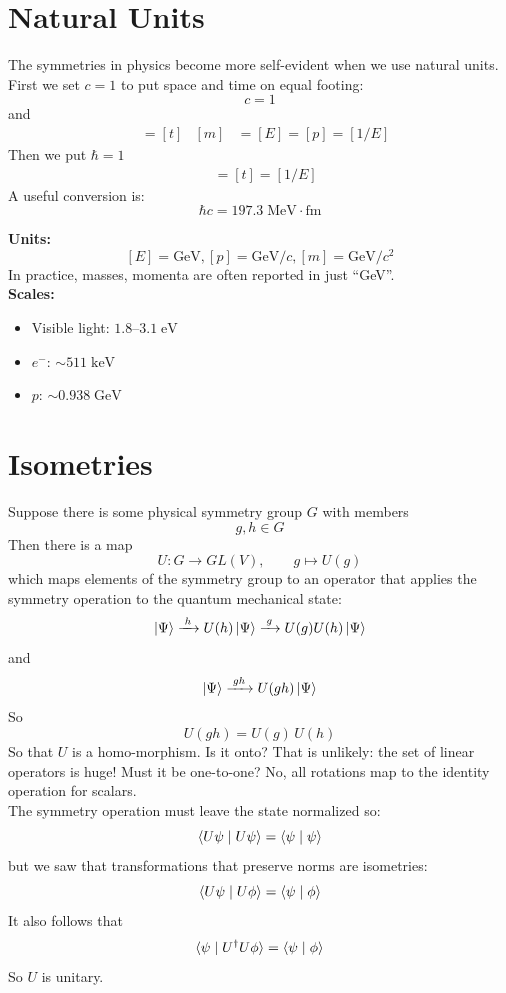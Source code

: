 \documentclass[12pt]{article}
\begin{document}
\section*{Natural Units}

The symmetries in physics become more self-evident when we use natural units.
First we set $c=1$ to put space and time on equal footing:
$$c = 1$$
and
\begin{align*}
[x] &= [t]  &  [m] &= [E] = [p] = [1/E]
\end{align*}
Then we put
$\hbar = 1$
\begin{align*}
[x] &= [t]  = [1/E]
\end{align*}
A useful conversion is:
\begin{equation*}
  \hbar c = 197.3 \;\text{MeV}\cdot\text{fm}
\end{equation*}

\noindent\textbf{Units:}
$$[E] = \text{GeV}, [p] = \text{GeV}/c, [m] = \text{GeV}/c^2$$
In practice, masses, momenta are often reported in just ``GeV''.\\

\noindent\textbf{Scales:}
\begin{itemize}
\item Visible light: $1.8$--$3.1\;\text{eV}$
\item $e^-$: $\sim 511\;\text{keV}$
\item $p$: $\sim 0.938\;\text{GeV}$
\end{itemize}

\section*{Isometries}

Suppose there is some physical symmetry group $G$ with members
$$g,h \in G$$
Then there is a map
$$U: G \to GL(V), \qquad g \mapsto U(g)$$
which maps elements of the symmetry group to an operator that
applies the symmetry operation to the quantum mechanical state:
$$\ket{\Psi} \xrightarrow{\;h\;} U(h) \ket{\Psi} \xrightarrow{\;g\;} U(g) U(h) \ket{\Psi}$$
and
$$\ket{\Psi} \xrightarrow{\;gh\;} U(gh) \ket{\Psi} $$
So
$$U(gh) = U(g) \, U(h)$$
So that $U$ is a homo-morphism.  Is it onto?  That is unlikely: the
set of linear operators is huge!  Must it be one-to-one?  No, all
rotations map to the identity operation for scalars.\\

The symmetry operation must leave the state normalized so:
$$\braket{ U\psi \mid U\psi } = \braket{ \psi \mid \psi }$$
but we saw that transformations that preserve norms are isometries:
$$\braket{ U\psi \mid U\phi } = \braket{ \psi \mid \phi }$$
It also follows that
$$\braket{\psi \mid U^\dagger U\phi } = \braket{ \psi \mid \phi }$$
So $U$ is unitary.
\end{document}
